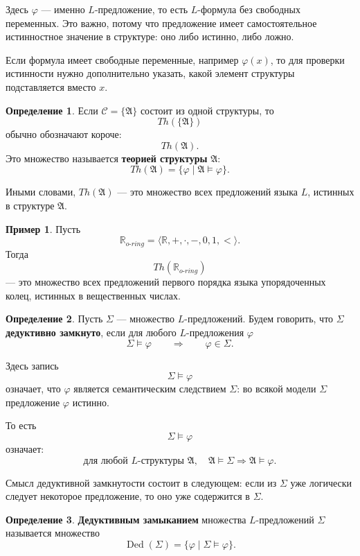 \documentclass[12pt,a4paper,oneside,openany]{book}
\theoremstyle{definition}
\newtheorem{definition}{Определение}[chapter]
\newtheorem{example}{Пример}[chapter]
\theoremstyle{plain}
\theoremstyle{remark}
\begin{document}
Здесь $\varphi$ — именно $L$-предложение, то есть $L$-формула без свободных переменных. Это важно, потому что предложение имеет самостоятельное истинностное значение в структуре: оно либо истинно, либо ложно.

Если формула имеет свободные переменные, например $\varphi(x)$, то для проверки истинности нужно дополнительно указать, какой элемент структуры подставляется вместо $x$.

\begin{definition}
Если $\mathcal C=\{\mathfrak A\}$ состоит из одной структуры, то
\[
Th(\{\mathfrak A\})
\]
обычно обозначают короче:
\[
Th(\mathfrak A).
\]
Это множество называется \textbf{теорией структуры} $\mathfrak A$:
\[
Th(\mathfrak A)
=
\{\varphi\mid \mathfrak A\models\varphi\}.
\]
\end{definition}

Иными словами, $Th(\mathfrak A)$ — это множество всех предложений языка $L$, истинных в структуре $\mathfrak A$.

\begin{example}
Пусть
\[
\mathbb R_{o\text{-}ring}
=
\langle\mathbb R,+,\cdot,-,0,1,<\rangle.
\]
Тогда
\[
Th(\mathbb R_{o\text{-}ring})
\]
— это множество всех предложений первого порядка языка упорядоченных колец, истинных в вещественных числах.
\end{example}

\begin{definition}
Пусть $\Sigma$ — множество $L$-предложений. Будем говорить, что $\Sigma$ \textbf{дедуктивно замкнуто}, если для любого $L$-предложения $\varphi$
\[
\Sigma\models\varphi
\qquad
\Longrightarrow
\qquad
\varphi\in\Sigma.
\]
\end{definition}

Здесь запись
\[
\Sigma\models\varphi
\]
означает, что $\varphi$ является семантическим следствием $\Sigma$: во всякой модели $\Sigma$ предложение $\varphi$ истинно.

То есть
\[
\Sigma\models\varphi
\]
означает:
\[
\text{для любой } L\text{-структуры } \mathfrak A,\quad
\mathfrak A\models\Sigma
\Rightarrow
\mathfrak A\models\varphi.
\]

Смысл дедуктивной замкнутости состоит в следующем: если из $\Sigma$ уже логически следует некоторое предложение, то оно уже содержится в $\Sigma$.

\begin{definition}
\textbf{Дедуктивным замыканием} множества $L$-предложений $\Sigma$ называется множество
\[
\operatorname{Ded}(\Sigma)
=
\{\varphi\mid \Sigma\models\varphi\}.
\]
\end{definition}
\end{document}

